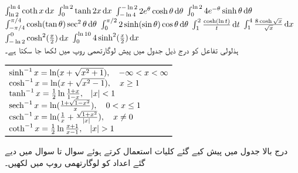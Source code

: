 $\int_{\ln 2}^{\ln 4}\coth x\dif x$
$\int_0^{\ln 2}\tanh 2x\dif x$
$\int_{-\ln 4}^{-\ln 2}2e^{\theta}\cosh \theta\dif \theta$
$\int_0^{\ln 2}4e^{-\theta}\sinh\theta\dif\theta$
$\int_{-\pi/4}^{\pi/4}\cosh(\tan\theta)\sec^2\theta\dif\theta$
$\int_0^{\pi/2}2\sinh(\sin\theta)\cos\theta\dif\theta$
$\int_1^2\tfrac{\cosh(\ln t)}{t}\dif t$
$\int_1^4\tfrac{8\cosh \sqrt{x}}{\sqrt{x}}\dif x$
$\int_{-\ln 2}^0\cosh^2(\tfrac{x}{2})\dif x$
$\int_0^{\ln 10}4\sinh^2(\tfrac{x}{2})\dif x$
\\
ہذلولی تفاعل کو درج ذیل جدول میں پیش  لوگارتھمی روپ میں لکھا جا سکتا ہے۔

\(
\begin{array}{l}
\toprule
\sinh^{-1}x=\ln(x+\sqrt{x^2+1}),\quad -\infty<x<\infty\\
\cosh^{-1}x=\ln(x+\sqrt{x^2-1}),\quad x\ge 1\\
\tanh^{-1}x=\frac{1}{2}\ln\frac{1+x}{1-x},\quad \abs{x}<1\\
\sech^{-1}x=\ln(\frac{1+\sqrt{1-x^2}}{x}),\quad 0<x\le 1\\
\csch^{-1}x=\ln(\frac{1}{x}+\frac{\sqrt{1+x^2}}{\abs{x}}),\quad x\ne 0\\
\coth^{-1}x=\frac{1}{2}\ln\frac{x+1}{x-1},\quad \abs{x}>1\\
\bottomrule
\end{array}
\)

درج بالا  جدول میں پیش کیے گئے کلیات استعمال کرتے ہوئے سوال  تا سوال  میں دیے گئے  اعداد  کو لوگارتھمی روپ میں لکھیں۔


